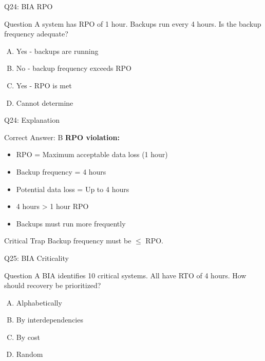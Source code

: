 \documentclass{beamer}
\begin{document}
			\begin{frame}{Q24: BIA RPO}
				\begin{block}{Question}
					A system has RPO of 1 hour. Backups run every 4 hours. Is the backup frequency adequate?
				\end{block}
				\begin{enumerate}[(A)]
					\item Yes - backups are running
					\item No - backup frequency exceeds RPO
					\item Yes - RPO is met
					\item Cannot determine
				\end{enumerate}
			\end{frame}
			
			\begin{frame}{Q24: Explanation}
				\begin{block}{Correct Answer: B}
					\textbf{RPO violation:}
					\begin{itemize}
						\item RPO = Maximum acceptable data loss (1 hour)
						\item Backup frequency = 4 hours
						\item Potential data loss = Up to 4 hours
						\item 4 hours > 1 hour RPO
						\item Backups must run more frequently
					\end{itemize}
				\end{block}
				\begin{alertblock}{Critical Trap}
					Backup frequency must be $\le$ RPO.
				\end{alertblock}
			\end{frame}
			
			\begin{frame}{Q25: BIA Criticality}
				\begin{block}{Question}
					A BIA identifies 10 critical systems. All have RTO of 4 hours. How should recovery be prioritized?
				\end{block}
				\begin{enumerate}[(A)]
					\item Alphabetically
					\item By interdependencies
					\item By cost
					\item Random
				\end{enumerate}
			\end{frame}
			
\end{document}
